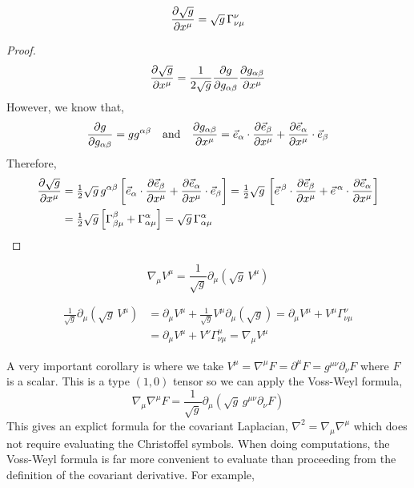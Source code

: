 \documentclass[11pt, a4paper]{article}
\begin{document}
\begin{lemma}
\[ \frac{\partial{\sqrt{g}}}{\partial{x^{\mu}}} = \sqrt{g} \, \Gamma^{\nu}_{\nu \mu}\]
\end{lemma}

\begin{proof}
\[ \frac{\partial{\sqrt{g}}}{\partial{x^\mu}} = \frac{1}{2 \sqrt{g}} \frac{\partial{g}}{\partial{g_{\alpha \beta}}} \frac{\partial{g_{\alpha \beta}}}{\partial{x^{\mu}}}\]
However, we know that,
\[ \frac{\partial{g}}{\partial{g_{\alpha \beta}}} = g g^{\alpha \beta} \quad \text{and} \quad \frac{\partial{g_{\alpha \beta}}}{\partial{x^\mu}} = \vec{e}_{\alpha} \cdot \frac{\partial{\vec{e}_{\beta}}}{\partial{x^\mu}} + \frac{\partial{\vec{e}_{\alpha}}}{\partial{x^{\mu}}} \cdot \vec{e}_{\beta}  \]
Therefore,
\begin{align*}
 \frac{\partial{\sqrt{g}}}{\partial{x^\mu}} & = \tfrac{1}{2} \sqrt{g} \, g^{\alpha \beta} \left[ \vec{e}_{\alpha} \cdot \frac{\partial{\vec{e}_{\beta}}}{\partial{x^\mu}} + \frac{\partial{\vec{e}_{\alpha}}}{\partial{x^{\mu}}} \cdot \vec{e}_{\beta} \right] = \tfrac{1}{2} \sqrt{g} \,  \left[  \vec{e}^{\, \beta} \cdot \frac{\partial{\vec{e}_{\beta}}}{\partial{x^\mu}} + \vec{e}^{\, \alpha} \cdot \frac{\partial{\vec{e}_{\alpha}}}{\partial{x^{\mu}}}  \right] 
\\
 & = \tfrac{1}{2} \sqrt{g} \left[ \Gamma^\beta_{\beta \mu} + \Gamma^{\alpha}_{\alpha \mu} \right] = \sqrt{g} \, \Gamma^{\alpha}_{\alpha \mu}
\end{align*}
\end{proof}

\begin{theorem}
\[ \nabla_\mu V^\mu = \frac{1}{\sqrt{g}} \partial_\mu \left( \sqrt{g} \, V^\mu \right) \]
\end{theorem}

\begin{theorem}
\begin{align*}
\frac{1}{\sqrt{g}} \partial_\mu \left( \sqrt{g} \, V^\mu \right) & = \partial_\mu V^\mu + \frac{1}{\sqrt{g}} V^\mu \partial_\mu (\sqrt{g})  = \partial_\mu V^\mu + V^\mu \Gamma^{\nu}_{\nu \mu} 
\\
& = \partial_\mu V^\mu + V^\nu \Gamma^{\mu}_{\nu \mu} = \nabla_{\mu} V^{\mu} 
\end{align*}
\end{theorem}
\noindent
A very important corollary is where we take $V^\mu = \nabla^{\mu} F = \partial^\mu F = g^{\mu \nu} \partial_{\nu} F$ where $F$ is a scalar. This is a type $(1,0)$ tensor so we can apply the Voss-Weyl formula,
\[ \nabla_\mu \nabla^\mu F = \frac{1}{\sqrt{g}} \partial_\mu ( \sqrt{g} \, g^{\mu \nu} \partial_\nu F ) \]
This gives an explict formula for the covariant Laplacian, $\nabla^2 = \nabla_\mu \nabla^\mu$ which does not require evaluating the Christoffel symbols. When doing computations, the Voss-Weyl formula is far more convenient to evaluate than proceeding from the definition of the covariant derivative. For example,
\end{document}
